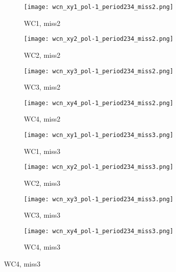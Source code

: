   
         \begin{figure}[h]	   
            \centering
            \begin{subfigure}[b]{0.23\textwidth}
            \centering
            \texttt{[image: wcn\_xy1\_pol-1\_period234\_miss2.png]}
            \caption{WC1, miss2}
            \label{fig_wc1}
            \end{subfigure}
            \hfill             
             \begin{subfigure}[b]{0.23\textwidth}
            \centering
            \texttt{[image: wcn\_xy2\_pol-1\_period234\_miss2.png]}
            \caption{WC2, miss2}
            \label{fig_wc2}
            \end{subfigure}
            \hfill 
              \begin{subfigure}[b]{0.23\textwidth}
            \centering
            \texttt{[image: wcn\_xy3\_pol-1\_period234\_miss2.png]}
            \caption{WC3, miss2}
            \label{fig_wc3}
            \end{subfigure}
            \hfill    
             \begin{subfigure}[b]{0.23\textwidth}
            \centering
            \texttt{[image: wcn\_xy4\_pol-1\_period234\_miss2.png]}
            \caption{WC4, miss2}
            \label{fig_wc4}
            \end{subfigure}
            \hfill
                     \begin{subfigure}[b]{0.23\textwidth}
            \centering
            \texttt{[image: wcn\_xy1\_pol-1\_period234\_miss3.png]}
            \caption{WC1, miss3}
            \label{fig_wc1}
            \end{subfigure}
            \hfill             
             \begin{subfigure}[b]{0.23\textwidth}
            \centering
            \texttt{[image: wcn\_xy2\_pol-1\_period234\_miss3.png]}
            \caption{WC2, miss3}
            \label{fig_wc2}
            \end{subfigure}
            \hfill 
              \begin{subfigure}[b]{0.23\textwidth}
            \centering
            \texttt{[image: wcn\_xy3\_pol-1\_period234\_miss3.png]}
            \caption{WC3, miss3}
            \label{fig_wc3}
            \end{subfigure}
            \hfill    
             \begin{subfigure}[b]{0.23\textwidth}
            \centering
            \texttt{[image: wcn\_xy4\_pol-1\_period234\_miss3.png]}
            \caption{WC4, miss3}
            \label{fig_wc4}
            \end{subfigure}
            \hfill
            

\end{figure}

